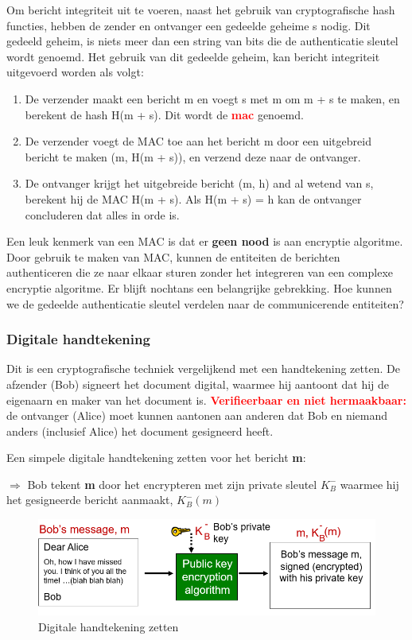 \noindent Om bericht integriteit uit te voeren, naast het gebruik van cryptografische hash functies, hebben de zender en ontvanger een gedeelde geheime s nodig. Dit gedeeld geheim, is niets meer dan een string van bits die de authenticatie sleutel wordt genoemd. Het gebruik van dit gedeelde geheim, kan bericht integriteit uitgevoerd worden als volgt:
\begin{enumerate}
    \item De verzender maakt een bericht m en voegt s met m om m + s te maken, en berekent de hash H(m + s). Dit wordt de \textcolor{red}{\textbf{\acrfull{mac}}} genoemd.
    \item De verzender voegt de MAC toe aan het bericht m door een uitgebreid bericht te maken (m, H(m + s)), en verzend deze naar de ontvanger.
    \item De ontvanger krijgt het uitgebreide bericht (m, h) and al wetend van s, berekent hij de MAC H(m + s). Als H(m + s) = h kan de ontvanger concluderen dat alles in orde is.
\end{enumerate}
Een leuk kenmerk van een MAC is dat er \textbf{geen nood} is aan encryptie algoritme. Door gebruik te maken van MAC, kunnen de entiteiten de berichten authenticeren die ze naar elkaar sturen zonder het integreren van een complexe encryptie algoritme.
Er blijft nochtans een belangrijke gebrekking. Hoe kunnen we de gedeelde authenticatie sleutel verdelen naar de communicerende entiteiten?



\subsubsection{Digitale handtekening}

Dit is een cryptografische techniek vergelijkend met een handtekening zetten.
\bi
\itf De afzender (Bob) signeert het document digital, waarmee hij aantoont dat hij de eigenaarn en maker van het document is. 
\itf \textcolor{red}{\textbf{Verifieerbaar en niet hermaakbaar:}} de ontvanger (Alice) moet kunnen aantonen aan anderen dat Bob en niemand anders (inclusief Alice) het document gesigneerd heeft.
\ei

\noindent Een simpele digitale handtekening zetten voor het bericht \textbf{m}:

\noindent $\Rightarrow$ Bob tekent \textbf{m} door het encrypteren met zijn private sleutel $K^-_B$ waarmee hij het gesigneerde bericht aanmaakt, $K^-_B (m)$


\begin{figure}[h]
    \centering
    \includegraphics[width=7in]{./img/imghfdst8/hfdst8puntje7.png}
    \caption{Digitale handtekening zetten }      
    \label{fig:Digitale handtekening zetten  }
\end{figure}

